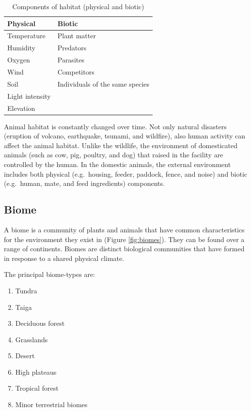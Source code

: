 \documentclass[]{book}
\providecommand{\tightlist}{%
  \setlength{\itemsep}{0pt}\setlength{\parskip}{0pt}}
\begin{document}
\begin{table}

\caption{\label{tab:habitat}Components of habitat (physical and biotic)}
\centering
\begin{tabular}[t]{ll}
\toprule
Physical & Biotic\\
\midrule
Temperature & Plant matter\\
Humidity & Predators\\
Oxygen & Parasites\\
Wind & Competitors\\
Soil & Individuals of the same species\\
\addlinespace
Light intensity & \\
Elevation & \\
\bottomrule
\end{tabular}
\end{table}

Animal habitat is constantly changed over time. Not only natural
disasters (eruption of volcano, earthquake, tsunami, and wildfire), also
human activity can affect the animal habitat. Unlike the wildlife, the
environment of domesticated animals (such as cow, pig, poultry, and dog)
that raised in the facility are controlled by the human. In the domestic
animals, the external environment includes both physical (e.g.~housing,
feeder, paddock, fence, and noise) and biotic (e.g.~human, mate, and
feed ingredients) components.

\subsection{Biome}\label{biome}

A biome is a community of plants and animals that have common
characteristics for the environment they exist in (Figure
\ref{fig:biomes}). They can be found over a range of continents. Biomes
are distinct biological communities that have formed in response to a
shared physical climate.

The principal biome-types are:

\begin{enumerate}
\def\labelenumi{\arabic{enumi}.}
\tightlist
\item
  Tundra
\item
  Taiga
\item
  Deciduous forest
\item
  Grasslands
\item
  Desert
\item
  High plateaus
\item
  Tropical forest
\item
  Minor terrestrial biomes
\end{enumerate}
\end{document}
